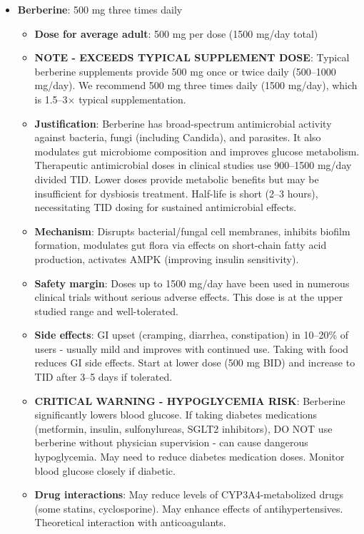 \begin{enumerate}
\begin{itemize}
        \item \textbf{Berberine}: 500 mg three times daily
        \begin{itemize}
            \item \textbf{Dose for average adult}: 500 mg per dose (1500 mg/day total)
            \item \textbf{NOTE - EXCEEDS TYPICAL SUPPLEMENT DOSE}: Typical berberine supplements provide 500 mg once or twice daily (500--1000 mg/day). We recommend 500 mg three times daily (1500 mg/day), which is 1.5--3$\times$ typical supplementation.
            \item \textbf{Justification}: Berberine has broad-spectrum antimicrobial activity against bacteria, fungi (including Candida), and parasites. It also modulates gut microbiome composition and improves glucose metabolism. Therapeutic antimicrobial doses in clinical studies use 900--1500 mg/day divided TID. Lower doses provide metabolic benefits but may be insufficient for dysbiosis treatment. Half-life is short (2--3 hours), necessitating TID dosing for sustained antimicrobial effects.
            \item \textbf{Mechanism}: Disrupts bacterial/fungal cell membranes, inhibits biofilm formation, modulates gut flora via effects on short-chain fatty acid production, activates AMPK (improving insulin sensitivity).
            \item \textbf{Safety margin}: Doses up to 1500 mg/day have been used in numerous clinical trials without serious adverse effects. This dose is at the upper studied range and well-tolerated.
            \item \textbf{Side effects}: GI upset (cramping, diarrhea, constipation) in 10--20\% of users - usually mild and improves with continued use. Taking with food reduces GI side effects. Start at lower dose (500 mg BID) and increase to TID after 3--5 days if tolerated.
            \item \textbf{CRITICAL WARNING - HYPOGLYCEMIA RISK}: Berberine significantly lowers blood glucose. If taking diabetes medications (metformin, insulin, sulfonylureas, SGLT2 inhibitors), DO NOT use berberine without physician supervision - can cause dangerous hypoglycemia. May need to reduce diabetes medication doses. Monitor blood glucose closely if diabetic.
            \item \textbf{Drug interactions}: May reduce levels of CYP3A4-metabolized drugs (some statins, cyclosporine). May enhance effects of antihypertensives. Theoretical interaction with anticoagulants.

\end{itemize}
\end{itemize}
\end{enumerate}

